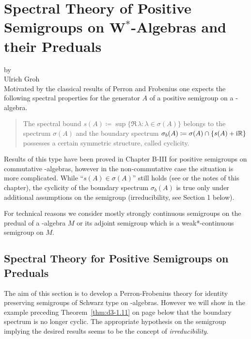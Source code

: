 \chapter{Spectral Theory of Positive Semigroups on \texorpdfstring{W$^{*}$}{W*}-Algebras and their Preduals}\label{chap:d3}
{\Large
\vspace*{-.75cm}
by \\[.25em]
Ulrich Groh
\vspace{.75cm}
\\
}
Motivated by the classical results of Perron and Frobenius one expects the following spectral properties for the generator $A$ of a positive semigroup on a \CA-algebra.
\begin{quote}
The spectral bound 
$s(A) \coloneqq \sup\{\Re\,\lambda \colon \lambda \in \sigma(A)\}$ belongs to the spectrum $\sigma(A)$ and the boundary spectrum
$  %
\sigma_{b}(A) \coloneqq \sigma(A) \cap \{s(A)+\im\R\}
$  %
possesses a certain symmetric structure, called cyclicity.
\end{quote}
Results of this type have been proved in Chapter B-III for positive semigroups on commutative \CA-algebras, however in the non-commutative case the situation is more complicated.
While \enquote{$s(A) \in \sigma(A)$} still holds (see \citet{greinervoigtwolff:1981} or the notes of this chapter), the cyclicity of the boundary spectrum $\sigma_{b}(A)$ is true only under additional assumptions on the semigroup (\eg irreducibility, see Section 1 below).

For technical reasons we consider mostly strongly continuous semigroups on the predual of a \WA-algebra $M$ or its adjoint semigroup which is a weak*-continuous semigroup on $M$.
\section{Spectral Theory for Positive Semigroups on Preduals}\label{sec:d3-1}
The aim of this section is to develop a Perron-Frobenius theory for identity preserving semigroups of Schwarz type on \WA-algebras.
However we will show in the example preceding Theorem~\ref{thm:d3-1.11} on page \pageref{thm:d3-1.11} below that the boundary spectrum is no longer cyclic.
The appropriate hypothesis on the semigroup implying the desired results seems to be the concept of \emph{irreducibility}.

